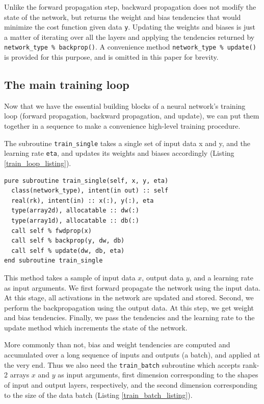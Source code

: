 \documentclass[sigplan, review=false, screen=true, balance=true]{acmart}
\begin{document}
Unlike the forward propagation step, backward propagation does not modify
the state of the network, but returns the weight and bias tendencies that
would minimize the cost function given data \lstinline{y}. Updating the weights
and biases is just a matter of iterating over all the layers and applying the
tendencies returned by \lstinline{network_type % backprop()}. A convenience
method \lstinline{network_type % update()} is provided for this purpose, and
is omitted in this paper for brevity.

\subsection{The main training loop}

Now that we have the essential building blocks of a neural network's training
loop (forward propagation, backward propagation, and update), we can put them
together in a sequence to make a convenience high-level training procedure.

The subroutine \lstinline{train_single} takes a single set of input data x and y,
and the learning rate \lstinline{eta}, and updates its weights and biases
accordingly (Listing \ref{train_loop_listing}).

\begin{minipage}{\linewidth}
\begin{lstlisting}[caption={A training procedure for a single data sample.}, captionpos=b, label={train_loop_listing}]
pure subroutine train_single(self, x, y, eta)
  class(network_type), intent(in out) :: self
  real(rk), intent(in) :: x(:), y(:), eta
  type(array2d), allocatable :: dw(:)
  type(array1d), allocatable :: db(:)
  call self % fwdprop(x)
  call self % backprop(y, dw, db)
  call self % update(dw, db, eta)
end subroutine train_single
\end{lstlisting}
\end{minipage}

This method takes a sample of input data $x$, output data $y$, and a learning
rate as input arguments. We first forward propagate the network using the input
data. At this stage, all activations in the network are updated and stored.
Second, we perform the backpropagation using the output data. At this step,
we get weight and bias tendencies. Finally, we pass the tendencies and the
learning rate to the update method which increments the state of the network.

More commonly than not, bias and weight tendencies are computed and accumulated
over a long sequence of inputs and outputs (a batch), and applied
at the very end. Thus we also need the \lstinline{train_batch} subroutine
which accepts rank-2 arrays $x$ and $y$ as input arguments, first dimension
corresponding to the shapes of input and output layers, respectively, and the
second dimension corresponding to the size of the data batch
(Listing \ref{train_batch_listing}).
\end{document}
